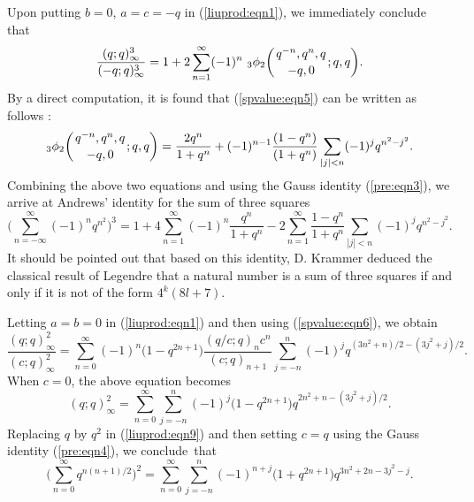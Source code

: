 \documentclass[10pt,a4paper]{amsart}
\numberwithin{equation}{section}
\begin{document}
Upon putting $b=0$, $a=c=-q$ in (\ref{liuprod:eqn1}), we immediately conclude that
\begin{equation*}	%
\frac{(q; q)_\infty^3}{(-q; q)_\infty^3}
=1+2\sum_{n=1}^\infty (-1)^n ~ {_3 \phi_2} \biggl({{q^{-n}, q^n, q}
	\atop{ -q, 0}}; q, q\biggr).
\end{equation*}
By a direct computation, it is found that (\ref{spvalue:eqn5}) can be written as follows \cite[equation~(3.10)]{Liu2013IJTN}:
\begin{equation*}%
	{_3\phi_2} \biggl({{q^{-n}, q^n, q}\atop{-q, 0}}; q, q\biggr)	
	=\frac{2q^n}{1+q^n}+(-1)^{n-1} \frac{(1-q^n)}{(1+q^n)}
	\sum_{|j|<n} (-1)^{j} q^{n^2-j^2}.
\end{equation*}
Combining the above two equations and using the Gauss identity (\ref{pre:eqn3}), we arrive at Andrews' identity for the sum of three squares \cite[equation~(5.16)]{Andrews86}
\begin{equation*}%
	\Biggl(\sum_{n=-\infty}^\infty (-1)^n q^{n^2}\Biggr)^{3}
	=1+4\sum_{n=1}^\infty (-1)^n \frac{q^n}{1+q^n}
	-2\sum_{n=1}^\infty \frac{1-q^n}{1+q^n} \sum_{|j|<n}(-1)^j q^{n^2-j^2}.
\end{equation*}
It should be pointed out that based on this identity, D. Krammer \cite{Krammer1993} deduced the classical result of Legendre that a natural number is a sum of three squares if and only if it is not of the form $4^k (8l+7)$.

Letting $a=b=0$ in (\ref{liuprod:eqn1}) and then using (\ref{spvalue:eqn6}), we obtain
\begin{equation}\label{liuprod:eqn9}
\frac{(q; q)^2_\infty}{(c; q)^2_\infty}
=\sum_{n=0}^\infty (-1)^n \bigl(1-q^{2n+1}\bigr) \frac{(q/c; q)_n c^n}{(c; q)_{n+1}} \sum_{j=-n}^n (-1)^j q^{(3n^2+n)/2-(3j^2+j)/2}.
\end{equation}
When $c=0$, the above equation becomes \cite[equation~(1.2)]{Liu2002}
\begin{equation*} %
(q; q)_\infty^2=\sum_{n=0}^\infty \sum_{j=-n}^n (-1)^j \bigl(1-q^{2n+1}\bigr) q^{2n^2+n-(3j^2+j)/2}.
\end{equation*}
Replacing $q$ by $q^2$ in (\ref{liuprod:eqn9}) and then setting $c=q$ using the Gauss identity (\ref{pre:eqn4}), we conclude~that%
\begin{equation*}%
\Biggl(\sum_{n=0}^\infty q^{n(n+1)/2}\Biggr)^2
=\sum_{n=0}^\infty \sum_{j=-n}^n (-1)^{n+j} \bigl(1+q^{2n+1}\bigr) q^{3n^2+2n-3j^2-j}.
\end{equation*}
\end{document}
